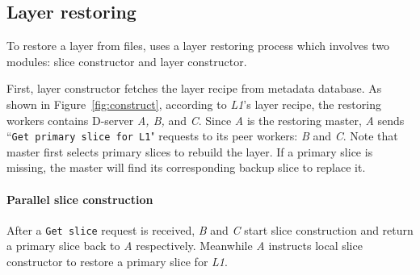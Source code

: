 \subsection{Layer restoring}
\label{sec:restore-desgin}





To restore a layer from files,
\sysname uses a layer restoring process
which involves two modules: slice constructor and layer constructor. 

First, 
layer constructor fetches the layer recipe from metadata database.
As shown in Figure~\ref{fig:construct}, 
according to \emph{L1}'s layer recipe, 
the restoring workers contains D-server \emph{A, B,} and \emph{C}.
Since \emph{A} is the restoring master,
\emph{A} sends ``\texttt{Get primary slice for L1}" requests to 
its peer workers: \emph{B} and \emph{C}.
Note that master first selects primary slices to rebuild the layer.
If a primary slice is missing,
the master will find its corresponding backup slice to replace it.

\paragraph{Parallel slice construction}


After a \texttt{Get slice} request is received, 
\emph{B} and \emph{C} start slice construction and 
return a primary slice back to \emph{A} respectively.
Meanwhile \emph{A} instructs local slice constructor to restore a primary slice for \emph{L1}.

